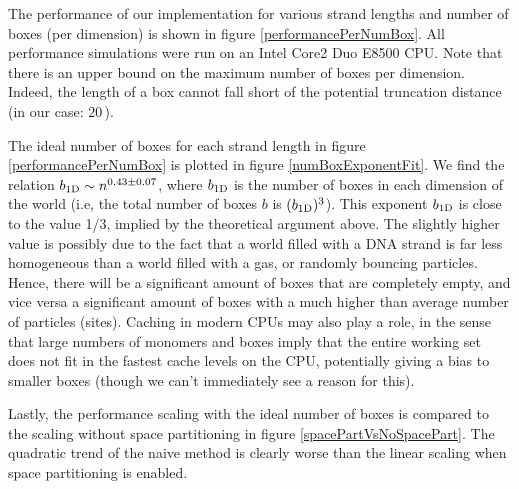 



The performance of our implementation for various strand lengths and number of boxes (per dimension) is shown in figure \ref{performancePerNumBox}. All performance simulations were run on an Intel Core2 Duo E8500 CPU. Note that there is an upper bound on the maximum number of boxes per dimension. Indeed, the length of a box cannot fall short of the potential truncation distance (in our case: $20$\,\Angstrom).

The ideal number of boxes for each strand length in figure \ref{performancePerNumBox} is plotted in figure \ref{numBoxExponentFit}. We find the relation ${b_\text{1D}} \sim n^{0.43 \pm 0.07}$, where ${b_\text{1D}}$ is the number of boxes in each dimension of the world (i.e, the total number of boxes $b$ is $({b_\text{1D}})^3$).
This exponent ${b_\text{1D}}$ is close to the value 1/3, implied by the theoretical argument above. The slightly higher value is possibly due to the fact that a world filled with a DNA strand is far less homogeneous than a world filled with a gas, or randomly bouncing particles.
Hence, there will be a significant amount of boxes that are completely empty, and vice versa a significant amount of boxes with a much higher than average number of particles (sites).
Caching in modern CPUs may also play a role, in the sense that large numbers of monomers and boxes imply that the entire working set does not fit in the fastest cache levels on the CPU, potentially giving a bias to smaller boxes (though we can't immediately see a reason for this).

Lastly, the performance scaling with the ideal number of boxes is compared to the scaling without space partitioning in figure \ref{spacePartVsNoSpacePart}. The quadratic trend of the naive method is clearly worse than the linear scaling when space partitioning is enabled.


